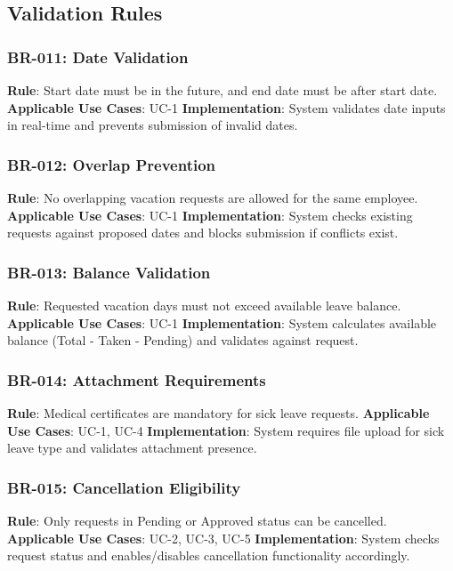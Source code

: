 \documentclass[12pt,a4paper]{article}
\begin{document}
\subsection{Validation Rules}

\subsubsection{BR-011: Date Validation}
\textbf{Rule}: Start date must be in the future, and end date must be after start date.
\textbf{Applicable Use Cases}: UC-1
\textbf{Implementation}: System validates date inputs in real-time and prevents submission of invalid dates.

\subsubsection{BR-012: Overlap Prevention}
\textbf{Rule}: No overlapping vacation requests are allowed for the same employee.
\textbf{Applicable Use Cases}: UC-1
\textbf{Implementation}: System checks existing requests against proposed dates and blocks submission if conflicts exist.

\subsubsection{BR-013: Balance Validation}
\textbf{Rule}: Requested vacation days must not exceed available leave balance.
\textbf{Applicable Use Cases}: UC-1
\textbf{Implementation}: System calculates available balance (Total - Taken - Pending) and validates against request.

\subsubsection{BR-014: Attachment Requirements}
\textbf{Rule}: Medical certificates are mandatory for sick leave requests.
\textbf{Applicable Use Cases}: UC-1, UC-4
\textbf{Implementation}: System requires file upload for sick leave type and validates attachment presence.

\subsubsection{BR-015: Cancellation Eligibility}
\textbf{Rule}: Only requests in Pending or Approved status can be cancelled.
\textbf{Applicable Use Cases}: UC-2, UC-3, UC-5
\textbf{Implementation}: System checks request status and enables/disables cancellation functionality accordingly.
\end{document}
